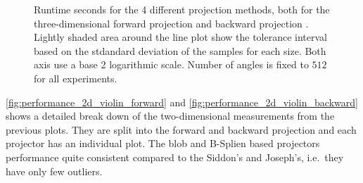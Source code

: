 \begin{figure}
	\centering


	\caption{Runtime seconds for the 4 different projection methods, both for the
		three-dimensional forward projection 
		and backward projection . Lightly
		shaded area around the line plot show the tolerance interval based on the stdandard
		deviation of the samples for each size. Both axis use a base 2 logarithmic scale.
		Number of angles is fixed to \(512\) for all experiments.}%
	\label{fig:performance_3d_lineplot}
\end{figure}

\autoref{fig:performance_2d_violin_forward} and \autoref{fig:performance_2d_violin_backward}
shows a detailed break down of the two-dimensional measurements from the previous plots. They are
split into the forward and backward projection and each projector has an individual plot. The blob
and B-Splien based projectors performance quite consistent compared to the Siddon's and Joseph's,
i.e.\ they have only few outliers.

